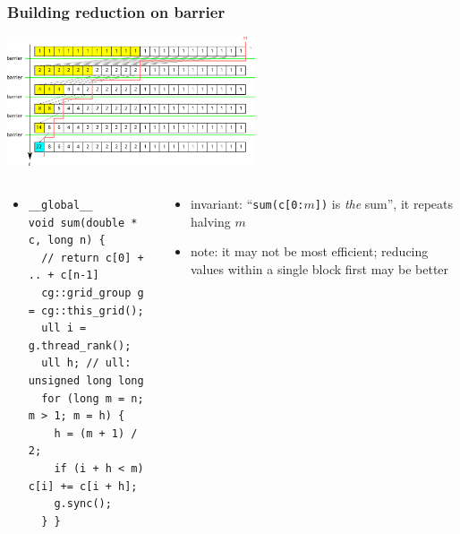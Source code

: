 \documentclass[12pt,dvipdfmx]{beamer}
\begin{document}
\begin{frame}[fragile]
  \frametitle{Building reduction on barrier}
\begin{center}
\includegraphics[width=0.55\textwidth]{out/pdf/svg/reduction_barrier.pdf}
\end{center}
  \begin{columns}
    \begin{column}{0.55\textwidth}
      \begin{center}
        \begin{itemize}
        \item []
\begin{lstlisting}
__global__
void sum(double * c, long n) {
  // return c[0] + .. + c[n-1]
  cg::grid_group g = cg::this_grid();
  ull i = g.thread_rank();
  ull h; // ull: unsigned long long
  for (long m = n; m > 1; m = h) {
    h = (m + 1) / 2;
    if (i + h < m) c[i] += c[i + h];
    g.sync();
  } }
\end{lstlisting}
\end{itemize}
\end{center}
\end{column}
    \begin{column}{0.47\textwidth}
\begin{itemize}
\item invariant: ``{\tt sum(c[0:$m$])} is {\it the} sum'',
  it repeats halving $m$
\item note: it may not be most efficient;
  reducing values within a single block first may be better
\end{itemize}
    \end{column}
  \end{columns}
\end{frame}
\end{document}
